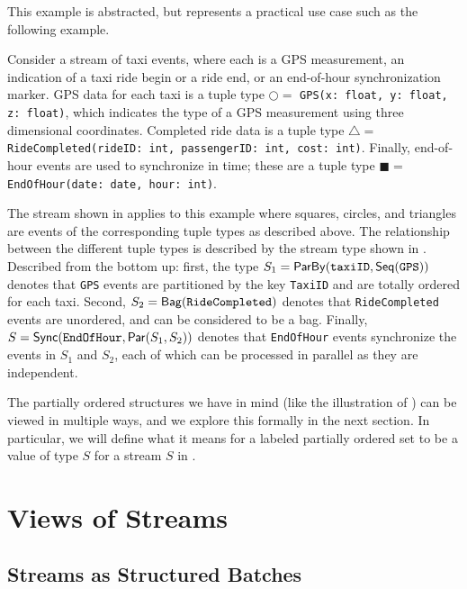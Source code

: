 This example is abstracted, but represents a practical use case such as the following example.

\begin{example}
\label{45:ex:taxi-distance-schema-headers}
\label{45:ex:taxi-distance-schema}
Consider a stream of taxi events, where each is a GPS measurement, an indication of a taxi ride begin or a ride end, or an end-of-hour synchronization marker.
GPS data for each taxi is a tuple type $\bigcirc =$ \texttt{GPS(x: float, y: float, z: float)}, which indicates the type of a GPS measurement using three dimensional coordinates.
Completed ride data is a tuple type $\triangle =$ \texttt{RideCompleted(rideID: int, passengerID: int, cost: int)}.
Finally, end-of-hour events are used to synchronize in time; these are a tuple type $\blacksquare =$ \texttt{EndOfHour(date: date, hour: int)}.

The stream shown in  applies to this example where squares, circles, and triangles are events of the corresponding tuple types as described above.
The relationship between the different tuple types is described by the stream type shown in .
Described from the bottom up: first, the type $S_1 = \mathsf{ParBy}({\texttt{taxiID}}, \mathsf{Seq}({\texttt{GPS}}))$ denotes that \texttt{GPS} events are partitioned by the key \texttt{TaxiID} and are totally ordered for each taxi.
Second, $S_2 = \mathsf{Bag}({\texttt{RideCompleted}})$ denotes that \texttt{RideCompleted} events are unordered, and can be considered to be a bag.
Finally, $S = \mathsf{Sync}({\texttt{EndOfHour}}, \mathsf{Par}({S_1}, {S_2}))$ denotes that \texttt{EndOfHour} events synchronize the events in $S_1$ and $S_2$, each of which can be processed in parallel as they are independent.
\end{example}

The partially ordered structures we have in mind (like the illustration of ) can be viewed in multiple ways, and we explore this formally in the next section.
In particular, we will define what it means for a labeled partially ordered set to be a value of type $S$ for a stream $S$ in .

\section{Views of Streams}

\subsection{Streams as Structured Batches}
\label{view:batches}

